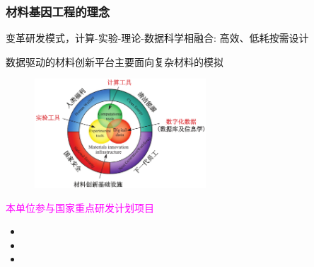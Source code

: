 \frame
{
	\frametitle{材料基因工程的理念}
\begin{minipage}[c]{0.31\textwidth}
\begin{itemize}%
\vspace*{-1.85in}
 {\fontsize{8.5pt}{6.0pt}\selectfont
	 \setlength{\itemsep}{10pt}
 \item 变革研发模式，计算-实验-理论-数据科学相融合: 高效、低耗按需设计
 \item 数据驱动的材料创新平台主要面向复杂材料的模拟}
 \end{itemize}
\end{minipage}
\hfill
\begin{minipage}[b]{0.67\textwidth}
\begin{figure}[h!]
\centering
\includegraphics[height=1.60in,width=2.55in]{Figures/Mat_Geno_Ene-1.png}
\label{Mater_Genome}
\end{figure}
\end{minipage}
\vskip 5pt
\textcolor{magenta}{本单位参与国家重点研发计划项目}
\begin{itemize}
	\setlength{\itemsep}{3pt}
	\item {\fontsize{8.2pt}{5.0pt}}{\fontsize{6.2pt}{4.2pt}}
	\item {\fontsize{8.2pt}{5.0pt}}{\fontsize{6.2pt}{4.2pt}}
	\item {\fontsize{8.2pt}{5.0pt}}{\fontsize{6.2pt}{4.2pt}}
\end{itemize}
}

